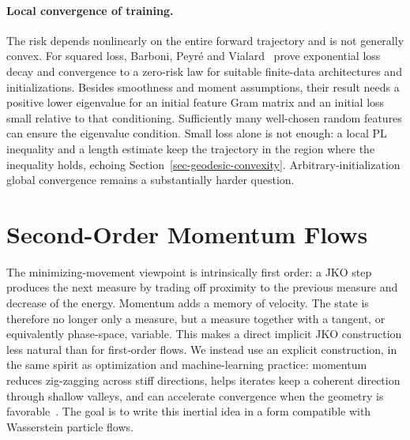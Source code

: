 \paragraph{Local convergence of training.}
The risk depends nonlinearly on the entire forward trajectory and is not generally convex. For squared loss, Barboni, Peyr\'e and Vialard~\cite[Theorem~4.2]{BarboniPeyreVialard2024ConditionalResNets} prove exponential loss decay and convergence to a zero-risk law for suitable finite-data architectures and initializations. Besides smoothness and moment assumptions, their result needs a positive lower eigenvalue for an initial feature Gram matrix and an initial loss small relative to that conditioning. Sufficiently many well-chosen random features can ensure the eigenvalue condition. Small loss alone is not enough: a local PL inequality and a length estimate keep the trajectory in the region where the inequality holds, echoing Section~\ref{sec-geodesic-convexity}. Arbitrary-initialization global convergence remains a substantially harder question.


\section{Second-Order Momentum Flows}
\label{sec-second-order-momentum-flows}

The minimizing-movement viewpoint is intrinsically first order: a JKO step produces the next measure by trading off proximity to the previous measure and decrease of the energy. Momentum adds a memory of velocity. The state is therefore no longer only a measure, but a measure together with a tangent, or equivalently phase-space, variable. This makes a direct implicit JKO construction less natural than for first-order flows. We instead use an explicit construction, in the same spirit as optimization and machine-learning practice: momentum reduces zig-zagging across stiff directions, helps iterates keep a coherent direction through shallow valleys, and can accelerate convergence when the geometry is favorable~\cite{Qian1999Momentum,Sutskever2013Momentum}. The goal is to write this inertial idea in a form compatible with Wasserstein particle flows.

